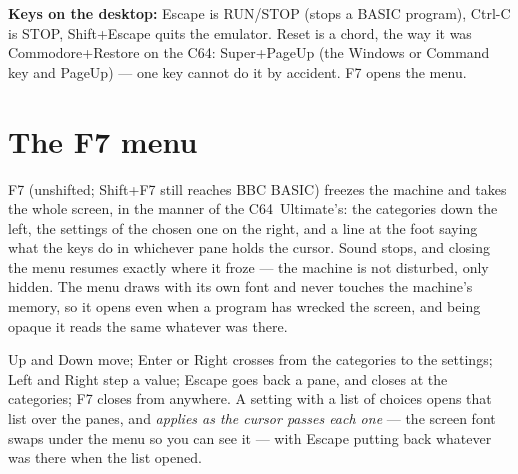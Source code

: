 \begin{aside}
\textbf{Keys on the desktop:} Escape is RUN/STOP (stops a BASIC program),
Ctrl-C is STOP, Shift+Escape quits the emulator. Reset is a chord, the
way it was Commodore+Restore on the C64: Super+PageUp (the Windows or
Command key and PageUp) --- one key cannot do it by accident. F7 opens
the menu.
\end{aside}

\section{The F7 menu}
F7 (unshifted; Shift+F7 still reaches BBC BASIC) freezes the machine and
takes the whole screen, in the manner of the C64~Ultimate's: the
categories down the left, the settings of the chosen one on the right,
and a line at the foot saying what the keys do in whichever pane holds
the cursor. Sound stops, and closing the menu resumes exactly where it
froze --- the machine is not disturbed, only hidden. The menu draws with
its own font and never touches the machine's memory, so it opens even
when a program has wrecked the screen, and being opaque it reads the same
whatever was there.

Up and Down move; Enter or Right crosses from the categories to the
settings; Left and Right step a value; Escape goes back a pane, and
closes at the categories; F7 closes from anywhere. A setting with a list
of choices opens that list over the panes, and \emph{applies as the
cursor passes each one} --- the screen font swaps under the menu so you
can see it --- with Escape putting back whatever was there when the list
opened.


